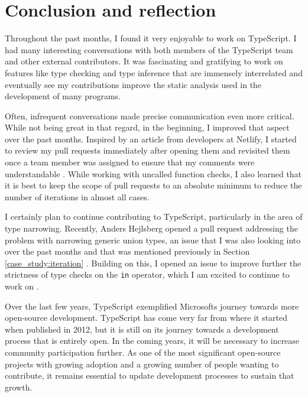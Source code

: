 \documentclass[12pt]{scrartcl}
\def\code#1{\texttt{\frenchspacing#1}}
\begin{document}
\section{Conclusion and reflection}

Throughout the past months, I found it very enjoyable to work on TypeScript. I had many interesting conversations with both members of the TypeScript team and other external contributors. It was fascinating and gratifying to work on features like type checking and type inference that are immensely interrelated and eventually see my contributions improve the static analysis used in the development of many programs.

Often, infrequent conversations made precise communication even more critical. While not being great in that regard, in the beginning, I improved that aspect over the past months. Inspired by an article from developers at Netlify, I started to review my pull requests immediately after opening them and revisited them once a team member was assigned to ensure that my comments were understandable \cite{Netlify}. While working with uncalled function checks, I also learned that it is best to keep the scope of pull requests to an absolute minimum to reduce the number of iterations in almost all cases.

I certainly plan to continue contributing to TypeScript, particularly in the area of type narrowing. Recently, Anders Hejlsberg opened a pull request addressing the problem with narrowing generic union types, an issue that I was also looking into over the past months and that was mentioned previously in Section \ref{case_study:iteration} \cite{13995, 43183}. Building on this, I opened an issue to improve further the strictness of type checks on the \code{in} operator, which I am excited to continue to work on \cite{43210}.

Over the last few years, TypeScript exemplified Microsofts journey towards more open-source development. TypeScript has come very far from where it started when published in 2012, but it is still on its journey towards a development process that is entirely open. In the coming years, it will be necessary to increase community participation further. As one of the most significant open-source projects with growing adoption and a growing number of people wanting to contribute, it remains essential to update development processes to sustain that growth.

\clearpage

\printbibliography
\end{document}
